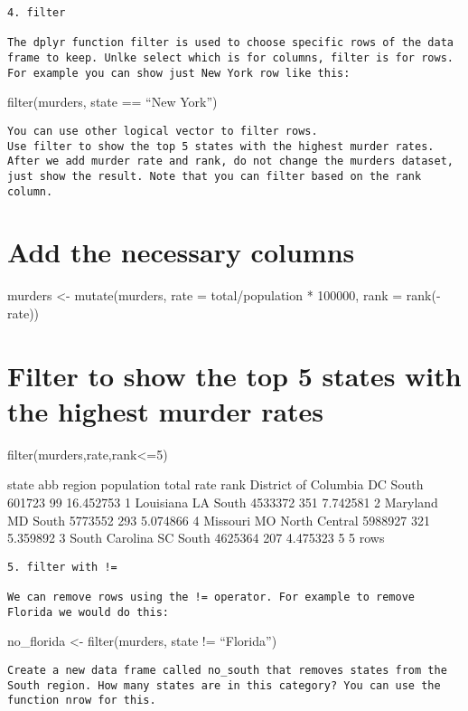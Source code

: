 \documentclass[
]{article}
\begin{document}
\begin{verbatim}
4. filter
    
The dplyr function filter is used to choose specific rows of the data frame to keep. Unlke select which is for columns, filter is for rows. For example you can show just New York row like this:
\end{verbatim}

filter(murders, state == ``New York'')

\begin{verbatim}
You can use other logical vector to filter rows.
Use filter to show the top 5 states with the highest murder rates. After we add murder rate and rank, do not change the murders dataset, just show the result. Note that you can filter based on the rank column.
\end{verbatim}

\hypertarget{add-the-necessary-columns}{%
\section{Add the necessary columns}\label{add-the-necessary-columns}}

murders \textless- mutate(murders, rate = total/population * 100000,
rank = rank(-rate))

\hypertarget{filter-to-show-the-top-5-states-with-the-highest-murder-rates}{%
\section{Filter to show the top 5 states with the highest murder
rates}\label{filter-to-show-the-top-5-states-with-the-highest-murder-rates}}

filter(murders,rate,rank\textless=5)

state abb region population total rate rank District of Columbia DC
South 601723 99 16.452753 1 Louisiana LA South 4533372 351 7.742581 2
Maryland MD South 5773552 293 5.074866 4 Missouri MO North Central
5988927 321 5.359892 3 South Carolina SC South 4625364 207 4.475323 5 5
rows

\begin{verbatim}
5. filter with !=

We can remove rows using the != operator. For example to remove Florida we would do this:
\end{verbatim}

no\_florida \textless- filter(murders, state != ``Florida'')

\begin{verbatim}
Create a new data frame called no_south that removes states from the South region. How many states are in this category? You can use the function nrow for this.
\end{verbatim}
\end{document}
